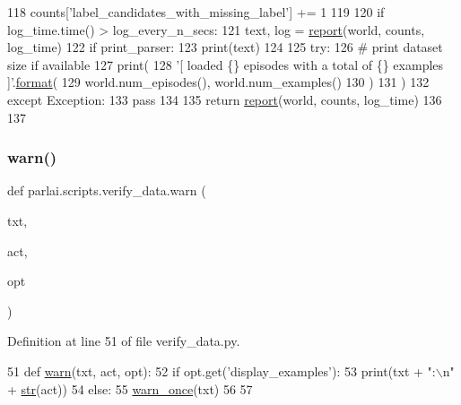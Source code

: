 \begin{DoxyCode}
118                         counts[\textcolor{stringliteral}{'label\_candidates\_with\_missing\_label'}] += 1
119 
120         \textcolor{keywordflow}{if} log\_time.time() > log\_every\_n\_secs:
121             text, log = \hyperlink{namespaceparlai_1_1scripts_1_1verify__data_a26153466b8f1f0c901768b4b3c56c885}{report}(world, counts, log\_time)
122             \textcolor{keywordflow}{if} print\_parser:
123                 print(text)
124 
125     \textcolor{keywordflow}{try}:
126         \textcolor{comment}{# print dataset size if available}
127         print(
128             \textcolor{stringliteral}{'[ loaded \{\} episodes with a total of \{\} examples ]'}.\hyperlink{namespaceparlai_1_1chat__service_1_1services_1_1messenger_1_1shared__utils_a32e2e2022b824fbaf80c747160b52a76}{format}(
129                 world.num\_episodes(), world.num\_examples()
130             )
131         )
132     \textcolor{keywordflow}{except} Exception:
133         \textcolor{keywordflow}{pass}
134 
135     \textcolor{keywordflow}{return} \hyperlink{namespaceparlai_1_1scripts_1_1verify__data_a26153466b8f1f0c901768b4b3c56c885}{report}(world, counts, log\_time)
136 
137 
\end{DoxyCode}
\mbox{\label{namespaceparlai_1_1scripts_1_1verify__data_ab1f264e6d69b1abe3399ba05512f8c66}} 
\subsubsection{\texorpdfstring{warn()}{warn()}}
{\footnotesize\ttfamily def parlai.\+scripts.\+verify\+\_\+data.\+warn (\begin{DoxyParamCaption}\item[{}]{txt,  }\item[{}]{act,  }\item[{}]{opt }\end{DoxyParamCaption})}



Definition at line 51 of file verify\+\_\+data.\+py.


\begin{DoxyCode}
51 \textcolor{keyword}{def }\hyperlink{namespaceparlai_1_1scripts_1_1verify__data_ab1f264e6d69b1abe3399ba05512f8c66}{warn}(txt, act, opt):
52     \textcolor{keywordflow}{if} opt.get(\textcolor{stringliteral}{'display\_examples'}):
53         print(txt + \textcolor{stringliteral}{":\(\backslash\)n"} + \hyperlink{namespacegenerate__task__READMEs_a5b88452ffb87b78c8c85ececebafc09f}{str}(act))
54     \textcolor{keywordflow}{else}:
55         \hyperlink{namespaceparlai_1_1utils_1_1misc_acf146e70ea7f6867969a7c2b545d4b4b}{warn\_once}(txt)
56 
57 
\end{DoxyCode}


